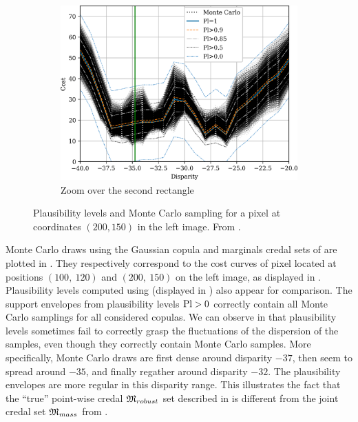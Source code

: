 \begin{figure}
\begin{subfigure}[t]{0.45\linewidth}
        \includegraphics[width=\linewidth]{Images/Chap_4/cost_curve_200_150_zoom2.png}
        \caption{Zoom over the second rectangle}
        \label{fig:montecarlo_gauss_200_150_zoom2}
    \end{subfigure}
    \caption{Plausibility levels and Monte Carlo sampling for a pixel at coordinates $(200, 150)$ in the left image.  From \cite{malinowski_uncertainty_2024}.}
    \label{fig:montecarlo_gauss_200_150}
\end{figure}

Monte Carlo draws using the Gaussian copula and marginals credal sets of  are plotted in . They respectively correspond to the cost curves of pixel located at positions $(100,~120)$ and $(200,~150)$ on the left image, as displayed in . Plausibility levels computed using  (displayed in ) also appear for comparison. The support envelopes from plausibility levels $\mathrm{Pl}>0$ correctly contain all Monte Carlo samplings for all considered copulas. We can observe in  that plausibility levels sometimes fail to correctly grasp the fluctuations of the dispersion of the samples, even though they correctly contain Monte Carlo samples. More specifically, Monte Carlo draws are first dense around disparity $-37$, then seem to spread around $-35$, and finally regather around disparity $-32$. The plausibility envelopes are more regular in this disparity range. This illustrates the fact that the ``true'' point-wise credal $\mathfrak{M}_{robust}$ set described in  is different from the joint credal set $\mathfrak{M}_{mass}$ from . 

